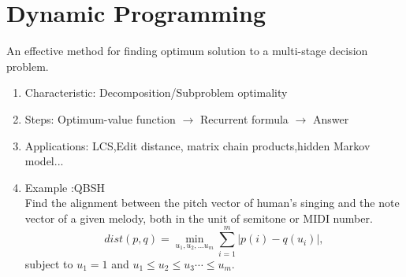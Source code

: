 \documentclass[12pt,a4paper,draft]{article}
\begin{document}
\section{Dynamic Programming} %
An effective method for finding optimum solution to a multi-stage decision problem.
\begin{enumerate}
\item Characteristic: Decomposition/Subproblem optimality
\item Steps: Optimum-value function $\rightarrow$ Recurrent formula $\rightarrow$ Answer
\item Applications: LCS,Edit distance, matrix chain products,hidden Markov model...
\item Example :QBSH\\
Find the alignment between the pitch vector of human's singing and the note vector of a given melody, both in the unit of semitone or MIDI number. \\
$$ dist(p, q)=\min_{u_1, u_2, ... u_{m}}\sum_{i=1}^{m} |p(i)-q(u_i)|, $$ subject to $u_1=1$ and $u_1 \leq u_2 \leq u_3 \cdots \leq u_{m}$.
\end{enumerate}
\end{document}
